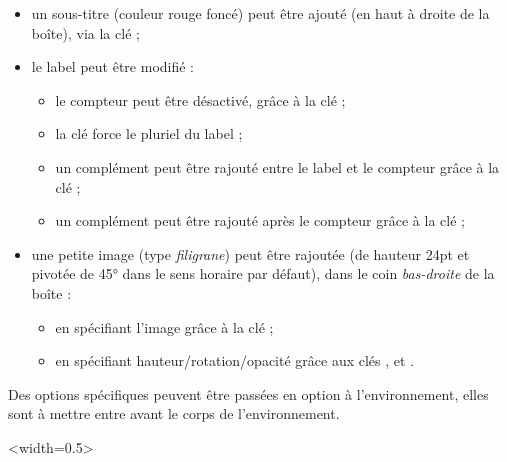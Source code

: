 \documentclass[french,11pt,a4paper]{article}
\begin{document}
\begin{itemize}
	\item un \textsf{sous-titre} (couleur \textsf{rouge foncé}) peut être ajouté (en haut à droite de la boîte), via la clé \MontreCode{[SousTitre=...]} ;
	\item le label peut être modifié :
	\begin{itemize}
		\item le compteur peut être désactivé, grâce à la clé \MontreCode{[Compteur=false]} ;
		\item la clé \MontreCode{[Pluriel]} force le pluriel du label ;
		\item un complément peut être rajouté entre le label et le compteur grâce à la clé \MontreCode{[ModifLabel=...]} ;
		\item un complément peut être rajouté après le compteur grâce à la clé \MontreCode{[ComplementTitre=...]} ;
	\end{itemize}
	\item une petite image (type \textit{filigrane}) peut être rajoutée (de hauteur 24pt et pivotée de 45° dans le sens horaire par défaut), dans le coin \textit{bas-droite} de la boîte :
	\begin{itemize}
		\item en spécifiant l'image grâce à la clé \MontreCode{[Logo=...]} ;
		\item en spécifiant hauteur/rotation/opacité grâce aux clés \MontreCode{[HauteurLogo=...]} , \MontreCode{[RotationLogo=...]} et \MontreCode{[OpaciteLogo=...]}.
	\end{itemize}
\end{itemize}

Des options spécifiques  peuvent être passées en option à l'environnement, elles sont à mettre entre  avant le corps de l'environnement.

\begin{demohigh}[language=latex/latex2,style/main=cyan!10,style/code=cyan!10]
\setcounter{CompteurBoiteDemo}{0}
\begin{BoiteDeDemo}[Compteur=false]
\lipsum[1][1-2]
\end{BoiteDeDemo}
\end{demohigh}

\begin{demohigh}[language=latex/latex2,style/main=cyan!10,style/code=cyan!10]
\begin{BoiteDeDemo}[Pluriel]<width=0.5\linewidth>
\lipsum[1][1-2]
\end{BoiteDeDemo}
\end{demohigh}
\end{document}
